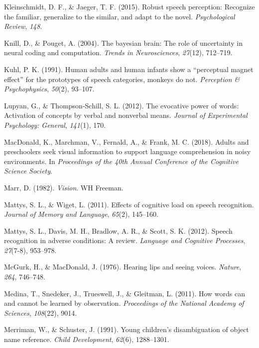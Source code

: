 \documentclass[english,,man,floatsintext]{apa6}
\theoremstyle{definition}
\theoremstyle{definition}
\theoremstyle{definition}
\theoremstyle{remark}
\begin{document}
\hypertarget{ref-kleinschmidt2015}{}
Kleinschmidt, D. F., \& Jaeger, T. F. (2015). Robust speech perception:
Recognize the familiar, generalize to the similar, and adapt to the
novel. \emph{Psychological Review}, \emph{148}.

\hypertarget{ref-Knill04}{}
Knill, D., \& Pouget, A. (2004). The bayesian brain: The role of
uncertainty in neural coding and computation. \emph{Trends in
Neurosciences}, \emph{27}(12), 712--719.

\hypertarget{ref-kuhl1991}{}
Kuhl, P. K. (1991). Human adults and human infants show a ``perceptual
magnet effect'' for the prototypes of speech categories, monkeys do not.
\emph{Perception \& Psychophysics}, \emph{50}(2), 93--107.

\hypertarget{ref-lupyan2012}{}
Lupyan, G., \& Thompson-Schill, S. L. (2012). The evocative power of
words: Activation of concepts by verbal and nonverbal means.
\emph{Journal of Experimental Psychology: General}, \emph{141}(1), 170.

\hypertarget{ref-macdonald2018}{}
MacDonald, K., Marchman, V., Fernald, A., \& Frank, M. C. (2018). Adults
and preschoolers seek visual information to support language
comprehension in noisy environments. In \emph{Proceedings of the 40th
Annual Conference of the Cognitive Science Society}.

\hypertarget{ref-marr1982}{}
Marr, D. (1982). \emph{Vision}. WH Freeman.

\hypertarget{ref-mattys11}{}
Mattys, S. L., \& Wiget, L. (2011). Effects of cognitive load on speech
recognition. \emph{Journal of Memory and Language}, \emph{65}(2),
145--160.

\hypertarget{ref-mattys12}{}
Mattys, S. L., Davis, M. H., Bradlow, A. R., \& Scott, S. K. (2012).
Speech recognition in adverse conditions: A review. \emph{Language and
Cognitive Processes}, \emph{27}(7-8), 953--978.

\hypertarget{ref-mcgurk1976}{}
McGurk, H., \& MacDonald, J. (1976). Hearing lips and seeing voices.
\emph{Nature}, \emph{264}, 746--748.

\hypertarget{ref-medina2011}{}
Medina, T., Snedeker, J., Trueswell, J., \& Gleitman, L. (2011). How
words can and cannot be learned by observation. \emph{Proceedings of the
National Academy of Sciences}, \emph{108}(22), 9014.

\hypertarget{ref-Merriman91}{}
Merriman, W., \& Schuster, J. (1991). Young children's disambiguation of
object name reference. \emph{Child Development}, \emph{62}(6),
1288--1301.
\end{document}

